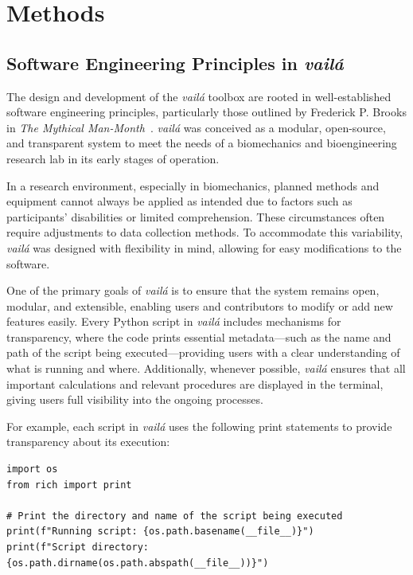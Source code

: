 \documentclass{article}
\begin{document}
\section{Methods}

\subsection{Software Engineering Principles in \textit{vailá}}

The design and development of the \textit{vailá} toolbox are rooted in well-established software engineering principles, particularly those outlined by Frederick P. Brooks in \textit{The Mythical Man-Month}~\citep{brooks1995mythical, brooks1995mythical_20years}. \textit{vailá} was conceived as a modular, open-source, and transparent system to meet the needs of a biomechanics and bioengineering research lab in its early stages of operation.

In a research environment, especially in biomechanics, planned methods and equipment cannot always be applied as intended due to factors such as participants' disabilities or limited comprehension. These circumstances often require adjustments to data collection methods. To accommodate this variability, \textit{vailá} was designed with flexibility in mind, allowing for easy modifications to the software.

One of the primary goals of \textit{vailá} is to ensure that the system remains open, modular, and extensible, enabling users and contributors to modify or add new features easily. Every Python script in \textit{vailá} includes mechanisms for transparency, where the code prints essential metadata—such as the name and path of the script being executed—providing users with a clear understanding of what is running and where. Additionally, whenever possible, \textit{vailá} ensures that all important calculations and relevant procedures are displayed in the terminal, giving users full visibility into the ongoing processes.

For example, each script in \textit{vailá} uses the following print statements to provide transparency about its execution:

\begin{verbatim}
import os
from rich import print

# Print the directory and name of the script being executed
print(f"Running script: {os.path.basename(__file__)}")
print(f"Script directory: {os.path.dirname(os.path.abspath(__file__))}")
\end{verbatim}
\end{document}
